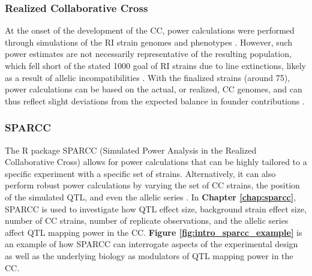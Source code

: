 \subsubsection{Realized Collaborative Cross}

At the onset of the development of the CC, power calculations were performed through simulations of the RI strain genomes and phenotypes \citep{Valdar2006c}. However, such power estimates are not necessarily representative of the resulting population, which fell short of the stated 1000 goal of RI strains \citep{Churchill2004} due to line extinctions, likely as a result of allelic incompatibilities \citep{Shorter2017}. With the finalized strains (around 75), power calculations can be based on the actual, or realized, CC genomes, and can thus reflect slight deviations from the expected balance in founder contributions \citep{Srivastava2017}.

\subsubsection{SPARCC}

The R package SPARCC (Simulated Power Analysis in the Realized Collaborative Cross) allows for power calculations that can be highly tailored to a specific experiment with a specific set of strains. Alternatively, it can also perform robust power calculations by varying the set of CC strains, the position of the simulated QTL, and even the allelic series \citep{Yalcin2005}. In \textbf{Chapter \ref{chap:sparcc}}, SPARCC is used to investigate how QTL effect size, background strain effect size, number of CC strains, number of replicate observations, and the allelic series affect QTL mapping power in the CC. \textbf{Figure \ref{fig:intro_sparcc_example}} is an example of how SPARCC can interrogate aspects of the experimental design as well as the underlying biology as modulators of QTL mapping power in the CC.

